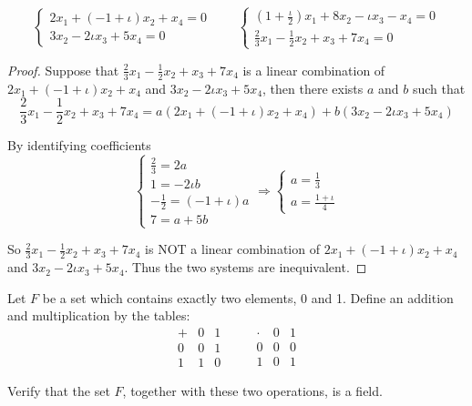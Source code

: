 \begin{exercise}
    \[
        \begin{cases}
            2x_{1} + (-1 + \iota)x_{2} + x_{4} = 0 \\
            3x_{2} - 2\iota x_{3} + 5x_{4} = 0
        \end{cases}
        \qquad
        \begin{cases}
            \left(1 + \frac{\iota}{2}\right)x_{1} + 8x_{2} - \iota x_{3} - x_{4} = 0 \\
            \frac{2}{3}x_{1} - \frac{1}{2}x_{2} + x_{3} + 7x_{4} = 0
        \end{cases}
    \]
\end{exercise}

\begin{proof}
    Suppose that $\frac{2}{3}x_{1} - \frac{1}{2}x_{2} + x_{3} + 7x_{4}$ is a linear combination of $2x_{1} + (-1 + \iota)x_{2} + x_{4}$ and $3x_{2} - 2\iota x_{3} + 5x_{4}$, then there exists $a$ and $b$ such that
    \[
        \frac{2}{3}x_{1} - \frac{1}{2}x_{2} + x_{3} + 7x_{4} = a(2x_{1} + (-1 + \iota)x_{2} + x_{4}) + b(3x_{2} - 2\iota x_{3} + 5x_{4})
    \]

    By identifying coefficients
    \[
        \begin{cases}
            \frac{2}{3} = 2a             \\
            1 = -2\iota b                \\
            -\frac{1}{2} = (-1 + \iota)a \\
            7 = a + 5b
        \end{cases}
        \Longrightarrow
        \begin{cases}
            a = \frac{1}{3} \\
            a = \frac{1 + \iota}{4}
        \end{cases}
    \]

    So $\frac{2}{3}x_{1} - \frac{1}{2}x_{2} + x_{3} + 7x_{4}$ is NOT a linear combination of $2x_{1} + (-1 + \iota)x_{2} + x_{4}$ and $3x_{2} - 2\iota x_{3} + 5x_{4}$. Thus the two systems are inequivalent.
\end{proof}

\begin{exercise}
    Let $F$ be a set which contains exactly two elements, 0 and 1. Define an addition and multiplication by the tables:
    \[
        \begin{array}{c|cc}
            + & 0 & 1 \\
            \hline
            0 & 0 & 1 \\
            1 & 1 & 0
        \end{array}
        \qquad
        \begin{array}{c|cc}
            \cdot & 0 & 1 \\
            \hline
            0     & 0 & 0 \\
            1     & 0 & 1
        \end{array}
    \]

    Verify that the set $F$, together with these two operations, is a field.
\end{exercise}


